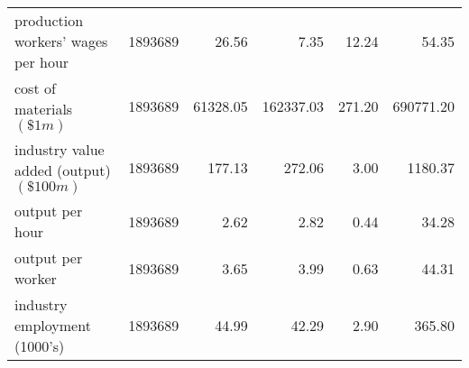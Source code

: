 \begin{table}[H]
{\begin{tabular}{lrrrrr}
            production workers' wages per hour                      & 1893689 & 26.56     & 7.35       & 12.24   & 54.35      \\
            cost of materials $(\$1m)$                              & 1893689 & 61328.05  & 162337.03  & 271.20  & 690771.20  \\
            industry value added (output) $(\$100m)$                & 1893689 & 177.13    & 272.06     & 3.00    & 1180.37    \\
            output per hour                                         & 1893689 & 2.62      & 2.82       & 0.44    & 34.28      \\
            output per worker                                       & 1893689 & 3.65      & 3.99       & 0.63    & 44.31      \\
            industry employment (1000's)                            & 1893689 & 44.99     & 42.29      & 2.90    & 365.80     \\ \bottomrule\bottomrule
        \end{tabular}
    }
\end{table}
